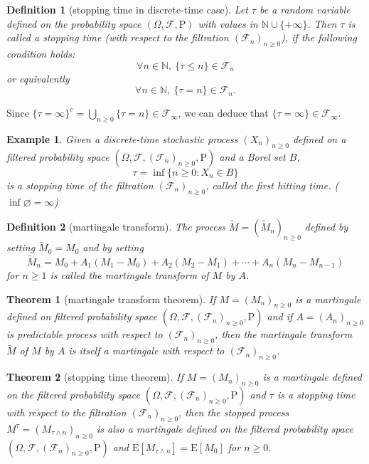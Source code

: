 \documentclass{report}
\newtheorem{definition}{Definition}[section]
\newtheorem{example}{Example}[section]
\newtheorem{theorem}{Theorem}[section]
\theoremstyle{nonumberplain}
\begin{document}
\begin{definition}[stopping time in discrete-time case]
	Let $\tau$  be a random variable defined on the probability space $(\Omega,\mathcal{F},\mathrm{P})$ with values in $\mathbb{N}\cup\{+\infty\}$. Then $\tau$ is called a stopping time (with respect to the filtration $(\mathcal{F}_{n})_{n\ge 0}$), if the following condition holds:
	\[
	\forall n\in\mathbb{N},\ \{\tau \le n\}\in {\mathcal {F}}_{n}
	\]
	or equivalently
	\[
	\forall n\in\mathbb{N},\ \{\tau =n\}\in {\mathcal {F}}_{n}.
	\]
\end{definition}
Since $\{\tau=\infty\}^{c}=\bigcup\limits_{n\ge0}\{\tau=n\} \in \mathcal{F}_{\infty}$, we can deduce that $\{\tau=\infty\}\in \mathcal{F}_{\infty}$.
\begin{example}
	Given a discrete-time stochastic process $(X_{n})_{n\ge 0}$ defined on a filtered probability space $(\Omega,\mathcal{F},(\mathcal{F}_{n})_{n\ge0 },\mathrm{P})$ and a Borel set $B$,
	\[
	\tau=\inf\{n\ge0:X_n\in B\}
	\]
	is a stopping time of the filtration $(\mathcal{F}_{n})_{n\ge0 }$, called the \emph{first hitting time}. ($\inf\varnothing = \infty $)
\end{example}

\begin{definition}[martingale transform]
The process $\widetilde{M}=(\widetilde{M}_{n})_{n\ge0}$ defined by setting $\widetilde{M}_{0}=M_{0}$ and by setting
\[
\widetilde{M}_{n}=M_{0}+A_{1}\left(M_{1}-M_{0}\right)+A_{2}\left(M_{2}-M_{1}\right)+\cdots+A_{n}\left(M_{n}-M_{n-1}\right)
\]
for $n \geq 1$ is called the martingale transform of $M$ by $A$.
\end{definition}

\begin{theorem}[martingale transform theorem]
If $M=(M_{n})_{n\ge0}$ is a martingale defined on filtered probability space $(\Omega,\mathcal{F},(\mathcal{F}_{n})_{n\ge0},\mathrm{P})$ and if $A=(A_{n})_{n\ge0}$ is predictable process with respect to $(\mathcal{F}_{n})_{n\ge0}$, then the martingale transform $\widetilde{M}$ of $M$ by $A$ is itself a martingale with respect to $(\mathcal{F}_{n})_{n\ge0}$.
\end{theorem}

\begin{theorem}[stopping time theorem]
If $M=(M_{n})_{n\ge0}$ is a martingale defined on the filtered probability space $(\Omega,\mathcal{F},(\mathcal{F}_{n})_{n\ge0},\mathrm{P})$ and $\tau$ is a stopping time with respect to the filtration $(\mathcal{F}_{n})_{n\ge 0}$, then the stopped process $M^\tau=(M_{\tau\wedge{n}})_{n\ge0}$ is also a martingale defined on the filtered probability space $(\Omega,\mathcal{F},(\mathcal{F}_{n})_{n\ge0},\mathrm{P})$ and $\mathrm{E}[M_{\tau\wedge{n}}]=\mathrm{E}[M_0]$ for $n\ge0$.
\end{theorem}
\end{document}
